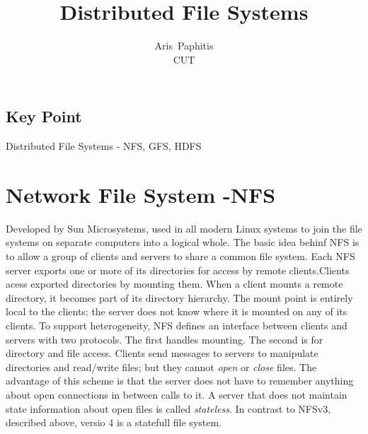 \documentclass[letterpaper,twocolumn,10pt]{article}
\begin{document}
\date{}

\title{\Large \bf Distributed File Systems}

\author{
{\rm Aris\ Paphitis}\\
CUT
} %

\maketitle

\thispagestyle{empty}


\subsection*{Key Point}
Distributed File Systems - NFS, GFS, HDFS

\section{Network File System -NFS}
Developed by Sun Microsystems, used in all modern Linux systems to join the file systems on separate computers into a logical whole.
The basic idea behinf NFS is to allow a group of clients and servers to share a common file system.
Each NFS server exports one or more of its directories for access by remote clients.Clients acess exported directories by mounting them. When a client mounts a remote directory, it becomes part of its directory hierarchy. The mount point is entirely local to the clients; the server does not know where it is mounted on any of its clients.
To support heterogeneity, NFS defines an interface between clients and servers with two protocols. The first handles mounting. The second is for directory and file access. Clients send messages to servers to manipulate directories and read/write files; but they cannot \textit{open} or \textit{close} files. The advantage of this scheme is that the server does not have to remember anything about open connections in between calls to it. A server that does not maintain state information about open files is called \textit{stateless}. 
In contrast to NFSv3, described above, versio 4 is a statefull file system.
\end{document}
